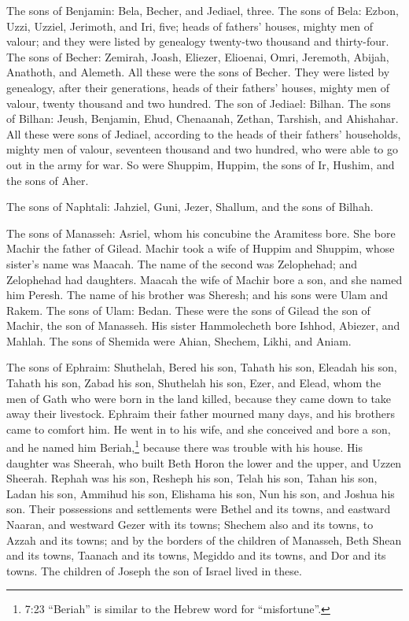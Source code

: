  The sons of Benjamin: Bela, Becher, and Jediael, three.
 The sons of Bela: Ezbon, Uzzi, Uzziel, Jerimoth, and Iri,
five; heads of fathers' houses, mighty men of valour; and they were
listed by genealogy twenty-two thousand and thirty-four. 
The sons of Becher: Zemirah, Joash, Eliezer, Elioenai, Omri, Jeremoth,
Abijah, Anathoth, and Alemeth. All these were the sons of Becher.
 They were listed by genealogy, after their generations,
heads of their fathers' houses, mighty men of valour, twenty thousand
and two hundred.  The son of Jediael: Bilhan. The sons of
Bilhan: Jeush, Benjamin, Ehud, Chenaanah, Zethan, Tarshish, and
Ahishahar.  All these were sons of Jediael, according to
the heads of their fathers' households, mighty men of valour, seventeen
thousand and two hundred, who were able to go out in the army for war.
 So were Shuppim, Huppim, the sons of Ir, Hushim, and the
sons of Aher.

 The sons of Naphtali: Jahziel, Guni, Jezer, Shallum, and
the sons of Bilhah.

 The sons of Manasseh: Asriel, whom his concubine the
Aramitess bore. She bore Machir the father of Gilead. 
Machir took a wife of Huppim and Shuppim, whose sister's name was
Maacah. The name of the second was Zelophehad; and Zelophehad had
daughters.  Maacah the wife of Machir bore a son, and she
named him Peresh. The name of his brother was Sheresh; and his sons were
Ulam and Rakem.  The sons of Ulam: Bedan. These were the
sons of Gilead the son of Machir, the son of Manasseh.  His
sister Hammolecheth bore Ishhod, Abiezer, and Mahlah.  The
sons of Shemida were Ahian, Shechem, Likhi, and Aniam.

 The sons of Ephraim: Shuthelah, Bered his son, Tahath his
son, Eleadah his son, Tahath his son,  Zabad his son,
Shuthelah his son, Ezer, and Elead, whom the men of Gath who were born
in the land killed, because they came down to take away their livestock.
 Ephraim their father mourned many days, and his brothers
came to comfort him.  He went in to his wife, and she
conceived and bore a son, and he named him Beriah,\footnote{7:23
  ``Beriah'' is similar to the Hebrew word for ``misfortune''.} because
there was trouble with his house.  His daughter was
Sheerah, who built Beth Horon the lower and the upper, and Uzzen
Sheerah.  Rephah was his son, Resheph his son, Telah his
son, Tahan his son,  Ladan his son, Ammihud his son,
Elishama his son,  Nun his son, and Joshua his son.
 Their possessions and settlements were Bethel and its
towns, and eastward Naaran, and westward Gezer with its towns; Shechem
also and its towns, to Azzah and its towns;  and by the
borders of the children of Manasseh, Beth Shean and its towns, Taanach
and its towns, Megiddo and its towns, and Dor and its towns. The
children of Joseph the son of Israel lived in these.

